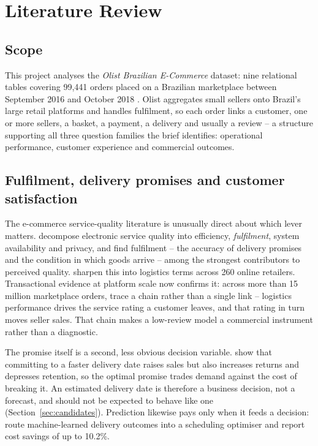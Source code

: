 \section{Literature Review}

\subsection{Scope}

This project analyses the \emph{Olist Brazilian E-Commerce} dataset: nine
relational tables covering 99{,}441 orders placed on a Brazilian marketplace
between September 2016 and October 2018 \citep{olist2018dataset}. Olist aggregates
small sellers onto Brazil's large retail platforms and handles fulfilment, so each
order links a customer, one or more sellers, a basket, a payment, a delivery and
usually a review -- a structure supporting all three question families the brief
identifies: operational performance, customer experience and commercial outcomes.

\subsection{Fulfilment, delivery promises and customer satisfaction}

The e-commerce service-quality literature is unusually direct about which lever
matters. \citet{parasuraman2005esqual} decompose electronic service quality into
efficiency, \emph{fulfilment}, system availability and privacy, and find
fulfilment -- the accuracy of delivery promises and the condition in which goods
arrive -- among the strongest contributors to perceived quality.
\citet{rao2011elsq} sharpen this into logistics terms across 260 online retailers.
Transactional evidence at platform scale now confirms it: across more than 15
million marketplace orders, \citet{deshpande2023logistics} trace a chain rather
than a single link -- logistics performance drives the service rating a customer
leaves, and that rating in turn moves seller sales. That chain makes a low-review
model a commercial instrument rather than a diagnostic.

The promise itself is a second, less obvious decision variable.
\citet{cui2024promise} show that committing to a faster delivery date raises sales
but also increases returns and depresses retention, so the optimal promise trades
demand against the cost of breaking it. An estimated delivery date is therefore a
business decision, not a forecast, and should not be expected to behave like one
(Section~\ref{sec:candidates}). Prediction likewise pays only when it feeds a
decision: \citet{kandula2021prescriptive} route machine-learned delivery outcomes
into a scheduling optimiser and report cost savings of up to 10.2\%.

